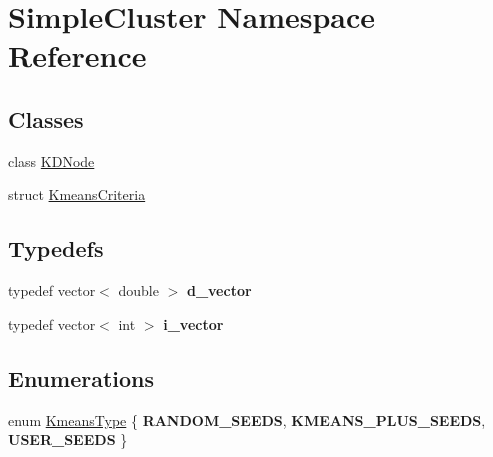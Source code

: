 \hypertarget{namespaceSimpleCluster}{\section{Simple\+Cluster Namespace Reference}
\label{namespaceSimpleCluster}
}
\subsection*{Classes}
\begin{DoxyCompactItemize}
\item 
class \hyperlink{classSimpleCluster_1_1KDNode}{K\+D\+Node}
\item 
struct \hyperlink{structSimpleCluster_1_1KmeansCriteria}{Kmeans\+Criteria}
\end{DoxyCompactItemize}
\subsection*{Typedefs}
\begin{DoxyCompactItemize}
\item 
\hypertarget{namespaceSimpleCluster_a2c39f662ef8ab290b2a0613dbc3b4c4e}{typedef vector$<$ double $>$ {\bfseries d\+\_\+vector}}\label{namespaceSimpleCluster_a2c39f662ef8ab290b2a0613dbc3b4c4e}

\item 
\hypertarget{namespaceSimpleCluster_ab17abba17860f283d1defd90861cb798}{typedef vector$<$ int $>$ {\bfseries i\+\_\+vector}}\label{namespaceSimpleCluster_ab17abba17860f283d1defd90861cb798}

\end{DoxyCompactItemize}
\subsection*{Enumerations}
\begin{DoxyCompactItemize}
\item 
enum \hyperlink{namespaceSimpleCluster_a8a8f57121b69a7b43575e4d6a53928e2}{Kmeans\+Type} \{ {\bfseries R\+A\+N\+D\+O\+M\+\_\+\+S\+E\+E\+D\+S}, 
{\bfseries K\+M\+E\+A\+N\+S\+\_\+\+P\+L\+U\+S\+\_\+\+S\+E\+E\+D\+S}, 
{\bfseries U\+S\+E\+R\+\_\+\+S\+E\+E\+D\+S}
 \}
\end{DoxyCompactItemize}
